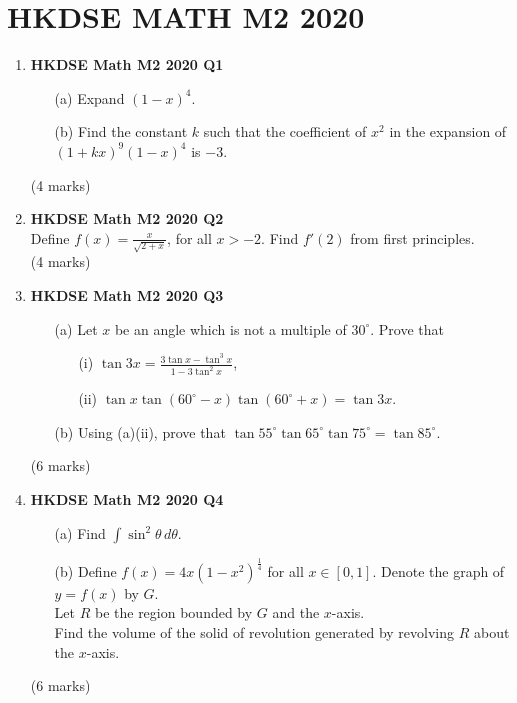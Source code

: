 \documentclass{report}
\begin{document}
\chapter{HKDSE MATH M2 2020}
\begin{enumerate}
	\item \textbf{HKDSE Math M2 2020 Q1}
	\begin{enumerate}
		\item [(a)] Expand $(1-x)^4$.
		\item [(b)] Find the constant $k$ such that the coefficient of $x^2$ in the expansion of $(1+kx)^9(1-x)^4$ is $-3$.
	\end{enumerate}
	(4 marks)

	\item \textbf{HKDSE Math M2 2020 Q2}\\
	Define $\displaystyle f(x) = \frac{x}{\sqrt{2+x}}$, for all $x > -2$. Find $f'(2)$ from first principles. \\(4 marks)

	\item \textbf{HKDSE Math M2 2020 Q3}
	\begin{enumerate}
		\item [(a)] Let $x$ be an angle which is not a multiple of $30^\circ$. Prove that 
		\begin{enumerate}
			\item [(i)]$\tan{3x} = \displaystyle \frac{3\tan{x} - \tan^3{x}}{1-3\tan^2{x}}$, 
			\item [(ii)] $\tan{x} \tan(60^\circ - x)\tan(60^\circ + x) = \tan{3x}$. 
		\end{enumerate}
		\item [(b)] Using (a)(ii), prove that $\tan{55^\circ}\tan{65^\circ}\tan{75^\circ} = \tan{85^\circ}$.
	\end{enumerate}
	(6 marks)

	\item \textbf{HKDSE Math M2 2020 Q4}
	\begin{enumerate}
		\item [(a)]Find $\displaystyle \int \sin^2{\theta} \,d\theta$. 
		\item [(b)]Define $\displaystyle f(x) = 4x(1-x^2)^{\frac{1}{4}}$ for all $x \in [0,1]$. Denote the graph of $y = f(x) $ by $G$. \\
		Let $R$ be the region bounded by $G$ and the $x$-axis. \\
		Find the volume of the solid of revolution generated by revolving $R$ about the $x$-axis.
	\end{enumerate}
	(6 marks)


\end{enumerate}
\end{document}
